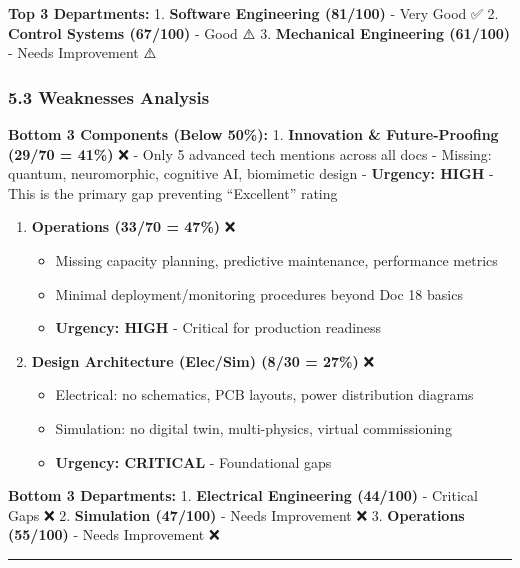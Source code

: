 \documentclass[
]{article}
\providecommand{\tightlist}{%
  \setlength{\itemsep}{0pt}\setlength{\parskip}{0pt}}
\begin{document}
\textbf{Top 3 Departments:} 1. \textbf{Software Engineering (81/100)} -
Very Good ✅ 2. \textbf{Control Systems (67/100)} - Good ⚠️ 3.
\textbf{Mechanical Engineering (61/100)} - Needs Improvement ⚠️

\hypertarget{weaknesses-analysis}{%
\subsubsection{5.3 Weaknesses Analysis}\label{weaknesses-analysis}}

\textbf{Bottom 3 Components (Below 50\%):} 1. \textbf{Innovation \&
Future-Proofing (29/70 = 41\%)} ❌ - Only 5 advanced tech mentions
across all docs - Missing: quantum, neuromorphic, cognitive AI,
biomimetic design - \textbf{Urgency: HIGH} - This is the primary gap
preventing ``Excellent'' rating

\begin{enumerate}
\def\labelenumi{\arabic{enumi}.}
\setcounter{enumi}{1}
\tightlist
\item
  \textbf{Operations (33/70 = 47\%)} ❌

  \begin{itemize}
  \tightlist
  \item
    Missing capacity planning, predictive maintenance, performance
    metrics
  \item
    Minimal deployment/monitoring procedures beyond Doc 18 basics
  \item
    \textbf{Urgency: HIGH} - Critical for production readiness
  \end{itemize}
\item
  \textbf{Design Architecture (Elec/Sim) (8/30 = 27\%)} ❌

  \begin{itemize}
  \tightlist
  \item
    Electrical: no schematics, PCB layouts, power distribution diagrams
  \item
    Simulation: no digital twin, multi-physics, virtual commissioning
  \item
    \textbf{Urgency: CRITICAL} - Foundational gaps
  \end{itemize}
\end{enumerate}

\textbf{Bottom 3 Departments:} 1. \textbf{Electrical Engineering
(44/100)} - Critical Gaps ❌ 2. \textbf{Simulation (47/100)} - Needs
Improvement ❌ 3. \textbf{Operations (55/100)} - Needs Improvement ❌

\begin{center}\rule{0.5\linewidth}{0.5pt}\end{center}
\end{document}
